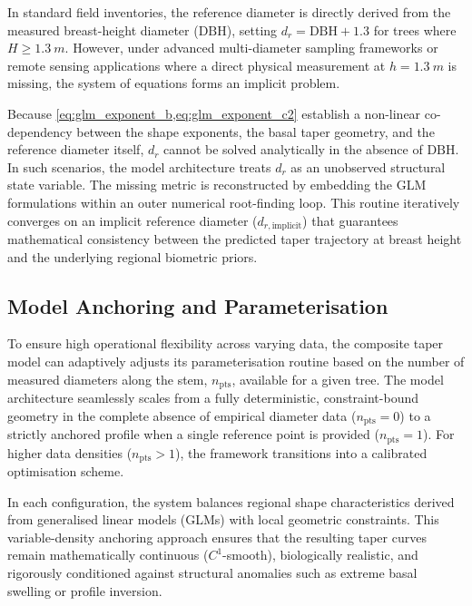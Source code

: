\documentclass[twocolumn, bibliography=totoc]{scrartcl}
\begin{document}
In standard field inventories, the reference diameter is directly derived from the measured breast-height diameter ($\text{DBH}$), setting $d_r = \text{DBH} + 1.3$ for trees where $H \geq \qty{1.3}{m}$. However, under advanced multi-diameter sampling frameworks or remote sensing applications where a direct physical measurement at $h = \qty{1.3}{m}$ is missing, the system of equations forms an implicit problem. 

Because \cref{eq:glm_exponent_b,eq:glm_exponent_c2} establish a non-linear co-dependency between the shape exponents, the basal taper geometry, and the reference diameter itself, $d_r$ cannot be solved analytically in the absence of $\text{DBH}$. In such scenarios, the model architecture treats $d_r$ as an unobserved structural state variable. The missing metric is reconstructed by embedding the GLM formulations within an outer numerical root-finding loop. This routine iteratively converges on an implicit reference diameter ($d_{r,\text{implicit}}$) that guarantees mathematical consistency between the predicted taper trajectory at breast height and the underlying regional biometric priors.



\subsection{Model Anchoring and Parameterisation}

To ensure high operational flexibility across varying data, the composite taper model can adaptively adjusts its parameterisation routine based on the number of measured diameters along the stem, $n_{\text{pts}}$, available for a given tree. The model architecture seamlessly scales from a fully deterministic, constraint-bound geometry in the complete absence of empirical diameter data ($n_{\text{pts}} = 0$) to a strictly anchored profile when a single reference point is provided ($n_{\text{pts}} = 1$). For higher data densities ($n_{\text{pts}} > 1$), the framework transitions into a calibrated optimisation scheme. 

In each configuration, the system balances regional shape characteristics derived from generalised linear models (GLMs) with local geometric constraints. This variable-density anchoring approach ensures that the resulting taper curves remain mathematically continuous ($C^1$-smooth), biologically realistic, and rigorously conditioned against structural anomalies such as extreme basal swelling or profile inversion.
\end{document}
